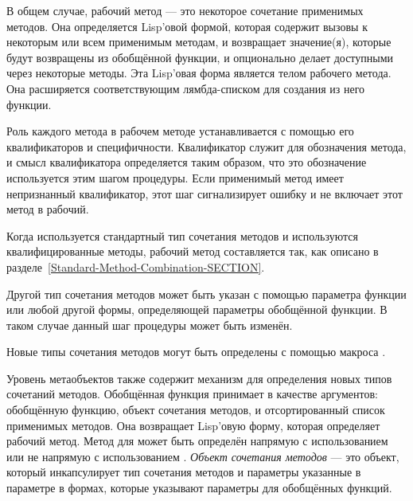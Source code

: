 В общем случае, рабочий метод --- это некоторое сочетание применимых
методов. Она определяется Lisp'овой формой, которая содержит вызовы к некоторым
или всем применимым методам, и возвращает значение(я), которые будут возвращены
из обобщённой функции, и опционально делает доступными через
 некоторые методы. Эта Lisp'овая форма является телом
рабочего метода. Она расширяется соответствующим лямбда-списком для создания из
него функции.

Роль каждого метода в рабочем методе устанавливается с помощью его
квалификаторов и специфичности. Квалификатор
служит для обозначения метода, и смысл квалификатора
определяется таким образом, что это обозначение используется этим шагом
процедуры. Если применимый метод имеет непризнанный квалификатор, этот шаг
сигнализирует ошибку и не включает этот метод в рабочий.

Когда используется стандартный тип сочетания методов и используются
квалифицированные методы, рабочий метод составляется так, как описано в
разделе~\ref{Standard-Method-Combination-SECTION}.

Другой тип сочетания методов может быть указан с помощью параметра 
 функции  или любой другой формы,
определяющей параметры обобщённой функции. В таком случае данный шаг процедуры
может быть изменён.

Новые типы сочетания методов могут быть определены с помощью макроса
.

Уровень метаобъектов также содержит механизм для определения новых типов
сочетаний методов. Обобщённая функция  принимает
в качестве аргументов: обобщённую функцию, объект сочетания методов, и
отсортированный список применимых методов. Она возвращает Lisp'овую форму,
которая определяет рабочий метод.
Метод для  может быть определён напрямую с
использованием  или не напрямую с использованием
.
\emph{Объект сочетания методов} --- это объект, который инкапсулирует тип
сочетания методов и параметры указанные в параметре  в
формах, которые указывают параметры для обобщённых функций.

